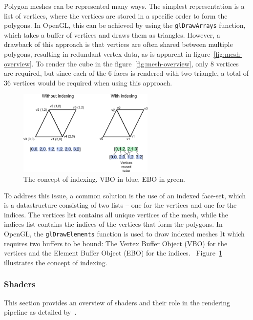 Polygon meshes can be represented many ways.
The simplest representation is a list of vertices, where the vertices are stored in a specific order to form the polygons.
In OpenGL, this can be achieved by using the \texttt{glDrawArrays} function,
which takes a buffer of vertices and draws them as triangles.
However, a drawback of this approach is that vertices are often shared between multiple polygons,
resulting in redundant vertex data, as is apparent in figure~\ref{fig:mesh-overview}.
To render the cube in the figure~\ref{fig:mesh-overview}, only 8 vertices are required,
but since each of the 6 faces is rendered with two triangle,
a total of 36 vertices would be required when using this approach.~\cite{dorner_virtual_2019, de_vries_learn_2020}


\begin{figure}[h]
    \centering
    \includegraphics[width=0.60\textwidth]{images/index_buffer}
    \caption{The concept of indexing. VBO in blue, EBO in green.}
    \label{fig:index-buffer}
\end{figure}

To address this issue, a common solution is the use of an indexed face-set, which is a datastructure consisting
of two lists -- one for the vertices and one for the indices.
The vertices list contains all unique vertices of the mesh, while the indices list contains the indices of the vertices that form the polygons.
In OpenGL, the \texttt{glDrawElements} function is used to draw indexed meshes
It which requires two buffers to be bound:
The Vertex Buffer Object (VBO) for the vertices and the Element Buffer Object (EBO) for the indices.~\cite{dorner_virtual_2019, de_vries_learn_2020}
Figure~\ref{fig:index-buffer} illustrates the concept of indexing.

\subsubsection{Shaders}\label{subsec:shaders}

This section provides an overview of shaders and their role in the rendering pipeline as detailed by~\cite{de_vries_learn_2020}.

